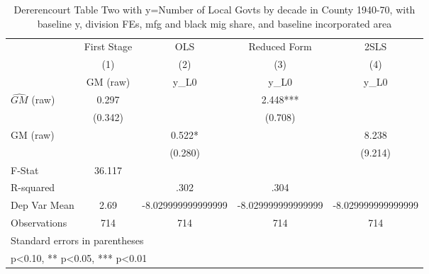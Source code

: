 \begin{table}[htbp]\centering
\def\sym#1{\ifmmode^{#1}\else\(^{#1}\)\fi}
\caption{Dererencourt Table Two with y=Number of Local Govts by decade in County 1940-70, with baseline y, division FEs, mfg and black mig share, and baseline incorporated area}
\begin{tabular}{l*{4}{c}}
\toprule
                    & First Stage   &         OLS   &Reduced Form   &        2SLS   \\
                    &\multicolumn{1}{c}{(1)}&\multicolumn{1}{c}{(2)}&\multicolumn{1}{c}{(3)}&\multicolumn{1}{c}{(4)}\\
                    &\multicolumn{1}{c}{GM  (raw)}&\multicolumn{1}{c}{y\_L0}&\multicolumn{1}{c}{y\_L0}&\multicolumn{1}{c}{y\_L0}\\
\midrule
$\hat{GM}$ (raw)    &       0.297   &               &       2.448***&               \\
                    &     (0.342)   &               &     (0.708)   &               \\
\addlinespace
GM  (raw)           &               &       0.522*  &               &       8.238   \\
                    &               &     (0.280)   &               &     (9.214)   \\
\midrule
F-Stat              &      36.117   &               &               &               \\
R-squared           &               &        .302   &        .304   &               \\
Dep Var Mean        &        2.69   &-8.029999999999999   &-8.029999999999999   &-8.029999999999999   \\
Observations        &         714   &         714   &         714   &         714   \\
\bottomrule
\multicolumn{5}{l}{\footnotesize Standard errors in parentheses}\\
\multicolumn{5}{l}{\footnotesize * p<0.10, ** p<0.05, *** p<0.01}\\
\end{tabular}
\end{table}
